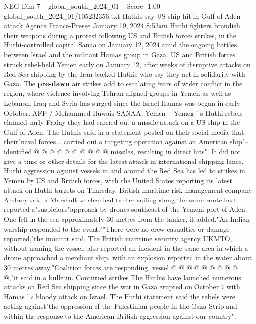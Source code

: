 \begin{textsample}{NEG Dim 7 – global\_south\_2024\_01 – Score -1.00 – global\_south\_2024\_01/105232356.txt}  \label{ex:f7_neg_145}
Huthis say US ship hit in Gulf of Aden attack Agence France-Presse January 19, 2024 8:53am Huthi fighters brandish their weapons during a protest following US and British forces strikes, in the Huthi-controlled capital Sanaa on January 12, 2024 amid the ongoing battles between Israel and the militant Hamas group in Gaza.
US and British forces struck rebel-held Yemen early on January 12, after weeks of disruptive attacks on Red Sea shipping by the Iran-backed Huthis who say they act in solidarity with Gaza.
The \textbf{pre-dawn} air strikes add to escalating fears of wider conflict in the region, where violence involving Tehran-aligned groups in Yemen as well as Lebanon, Iraq and Syria has surged since the Israel-Hamas was began in early October.
AFP / Mohammed Huwais SANAA, Yemen -- Yemen ' s Huthi rebels claimed early Friday they had carried out a missile attack on a US ship in the Gulf of Aden.
The Huthis said in a statement posted on their social media that their"naval forces... carried out a targeting operation against an American ship"-- identified @ @ @ @ @ @ @ @ @ @ missiles, resulting in direct hits".
It did not give a time or other details for the latest attack in international shipping lanes.
Huthi aggression against vessels in and around the Red Sea has led to strikes in Yemen by US and British forces, with the United States reporting its latest attack on Huthi targets on Thursday.
British maritime risk management company Ambrey said a Marshallese chemical tanker sailing along the same route had reported a"suspicious"approach by drones southeast of the Yemeni port of Aden.
One fell in the sea approximately 30 metres from the tanker, it added."An Indian warship responded to the event.""There were no crew casualties or damage reported,"the monitor said.
The British maritime security agency UKMTO, without naming the vessel, also reported an incident in the same area in which a drone approached a merchant ship, with an explosion reported in the water about 30 metres away."Coalition forces are responding, vessel @ @ @ @ @ @ @ @ @ @,"it said in a bulletin.
Continued strikes The Huthis have launched numerous attacks on Red Sea shipping since the war in Gaza erupted on October 7 with Hamas ' s bloody attack on Israel.
The Huthi statement said the rebels were acting against"the oppression of the Palestinian people in the Gaza Strip and within the response to the American-British aggression against our country".

\end{textsample}
